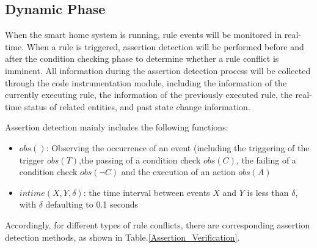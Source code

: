 \subsection{Dynamic Phase}
When the smart home system is running, rule events will be monitored in real-time. When a rule is triggered, assertion detection will be performed before and after the condition checking phase to determine whether a rule conflict is imminent. All information during the assertion detection process will be collected through the code instrumentation module, including the information of the currently executing rule, the information of the previously executed rule, the real-time status of related entities, and past state change information.

Assertion detection mainly includes the following functions:

\begin{itemize}
	\item $obs()$: Observing the occurrence of an event (including the triggering of the trigger $obs(T)$,the passing of a condition check $obs(C)$, the failing of a condition check $obs(\neg C)$ and the execution of an action $obs(A)$
	\item $intime(X,Y,\delta)$: the time interval between events $X$ and $Y$ is less than $\delta$, with $\delta$ defaulting to 0.1 seconds
\end{itemize}

Accordingly, for different types of rule conflicts, there are corresponding assertion detection methods, as shown in Table.\ref{Assertion_Verification}.


